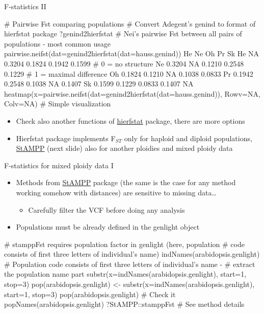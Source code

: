 \documentclass[compress, xelatex, 11pt, xcolor=svgnames, aspectratio=169, url={hyphens, lowtilde}]{beamer}
\begin{document}
\begin{frame}[fragile]{F-statistics II}
	\begin{spluscode}
    # Pairwise Fst comparing populations
    # Convert Adegent's genind to format of hierfstat package
    ?genind2hierfstat
    # Nei's pairwise Fst between all pairs of populations - most common usage
    pairwise.neifst(dat=genind2hierfstat(dat=hauss.genind))
           He     Ne     Oh     Pr     Sk
    He     NA 0.3204 0.1824 0.1942 0.1599 # 0 = no structure
    Ne 0.3204     NA 0.1210 0.2548 0.1229 # 1 = maximal difference
    Oh 0.1824 0.1210     NA 0.1038 0.0833
    Pr 0.1942 0.2548 0.1038     NA 0.1407
    Sk 0.1599 0.1229 0.0833 0.1407     NA
    heatmap(x=pairwise.neifst(dat=genind2hierfstat(dat=hauss.genind)),
      Rowv=NA, Colv=NA) # Simple visualization
	\end{spluscode}
	\begin{itemize}
		\item Check also another functions of \href{https://CRAN.R-project.org/package=hierfstat}{hierfstat} package, there are more options
		\item Hierfstat package implements F$_{ST}$ only for haploid and diploid populations, \href{https://CRAN.R-project.org/package=StAMPP}{StAMPP} (next slide) also for another ploidies and mixed ploidy data
	\end{itemize}
\end{frame}

\begin{frame}[fragile]{F-statistics for mixed ploidy data I}
	\begin{itemize}
		\item Methods from \href{https://CRAN.R-project.org/package=StAMPP}{StAMPP} package (the same is the case for any method working somehow with distances) are sensitive to missing data\ldots
		\begin{itemize}
			\item Carefully filter the VCF before doing any analysis
		\end{itemize}
		\item Populations must be already defined in the genlight object
	\end{itemize}
	\begin{spluscode}
    # stamppFst requires population factor in genlight (here, population
    # code consists of first three letters of individual's name)
    indNames(arabidopsis.genlight)
    # Population code consists of first three letters of individual's name -
    # extract the population name part
    substr(x=indNames(arabidopsis.genlight), start=1, stop=3)
    pop(arabidopsis.genlight) <- substr(x=indNames(arabidopsis.genlight),
      start=1, stop=3)
    pop(arabidopsis.genlight) # Check it
    popNames(arabidopsis.genlight)
    ?StAMPP::stamppFst # See method details
	\end{spluscode}
\end{frame}
\end{document}
